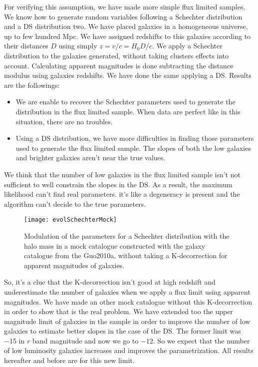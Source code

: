 For verifying this assumption, we have made more simple flux limited samples. We know how to generate random variables following a
Schechter distribution and a DS distribution two. We have placed galaxies in a homogeneous universe, up to few hundred Mpc. We have
assigned redshifts to this galaxies according to their distances $D$ using simply $z=v/c={H_0}{D}/c$. We apply a Schechter
distribution to the galaxies generated, without taking clusters effects into account. Calculating apparent magnitudes is done
subtracting the distance modulus using galaxies redshifts. We have done the same applying a DS. Results are the followings:
\begin{itemize}
	\item We are enable to recover the Schechter parameters used to generate the distribution in the flux limited sample. When
	data are perfect like in this situation, there are no troubles.
        \item Using a DS distribution, we have more difficulties in finding those parameters used to generate the flux limited
        sample. The slopes of both the low galaxies and brighter galaxies aren't near the true values.
\end{itemize}
We think that the number of low galaxies in the flux limited sample isn't not sufficient to well constrain the slopes in the DS. As
a result, the maximum likelihood can't find real parameters. it's like a degeneracy is present and the algorithm can't decide to the
true parameters.
\begin{figure}[htb]
	\centering
	\texttt{[image: evolSchechterMock]}
	\caption{\footnotesize{}Modulation of the parameters for a Schechter distribution with the halo mass in a mock catalogue
	constructed with the galaxy catalogue from the Guo2010a, without taking a K-decorrection for apparent magnitudes of
	galaxies.}
	\label{fig:parammock}
\end{figure}

So, it's a clue that the K-decorrection isn't good at high redshift and underestimate the number of galaxies when we apply a flux
limit using apparent magnitudes. We have made an other mock catalogue without this K-decorrection in order to show that is the real
problem. We have extended too the upper magnitude limit of galaxies in the sample in order to improve the number of low galaxies to
estimate better slopes in the case of the DS. The former limit was \num{-15} in $r$ band magnitude and now we go to \num{-12}. So we
expect that the number of low luminosity galaxies increases and improves the parametrization. All results hereafter and before are
for this new limit.

